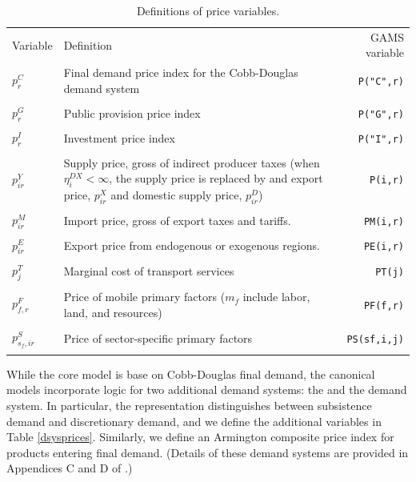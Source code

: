 \renewcommand{\arraystretch}{1}
\renewcommand{\tabcolsep}{1mm}
\begin{table}[t!]
\begin{center}
\caption{Definitions of price variables.}
\label{prices}
\small
\begin{tabular}{lp{3in}r}
\toprule
Variable &Definition & GAMS variable\\
\addlinespace
\midrule
\addlinespace
$p^C_{r}$      &       Final demand price index for the Cobb-Douglas
demand system &\texttt{P("C",r)}\\
\\
$p^G_{r}$      &       Public provision price index  &\texttt{P("G",r)}\\
\\
$p^I_{r}$      &       Investment price index &\texttt{P("I",r)}\\
\\
$p^Y_{ir}$     &       Supply price, gross of indirect producer
taxes (when $\eta^{DX}_{i} < \infty$, the supply price is
replaced by and export price, $p^X_{ir}$ and domestic supply price,
$p^D_{ir}$) &\texttt{P(i,r)}\\
\\
$p^M_{ir}$     &       Import price, gross of export
taxes and tariffs.&\texttt{PM(i,r)}\\
\\
$p^E_{ir}$     &       Export price from endogenous or exogenous
regions.&\texttt{PE(i,r)}\\
\\
$p^T_j$         &       Marginal cost of transport services
&\texttt{PT(j)}\\
\\
$p^F_{f,r}$     &       Price of mobile primary factors ($m_f$
include labor, land, and resources) &\texttt{PF(f,r)}\\
\\
$p^S_{s_f,ir}$     &       Price of sector-specific primary
factors&\texttt{PS(sf,i,j)}\\
\addlinespace
\bottomrule
\end{tabular}
\end{center}
\vspace{0.4in}
\end{table}

While the core \GTAPINGAMS model is base on Cobb-Douglas final demand, the canonical models incorporate logic for two additional demand systems: the \LES and the \CDE demand system.
In particular, the \LES representation distinguishes between subsistence demand and discretionary demand, and we define the additional variables in Table \ref{dsysprices}.
Similarly, we define an Armington composite price index for products entering \CDE final demand.
(Details of these demand systems are provided in Appendices C and D of \citet{LanzRutherford2016}.)

